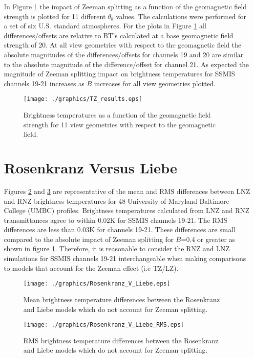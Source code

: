In Figure \ref{fig:TZ_results} the impact of Zeeman splitting as a function of the geomagnetic field strength is plotted for 11 different $\theta_{b}$ values. The calculations were performed for a set of six U.S. standard atmospheres. For the plots in Figure \ref{fig:TZ_results} all differences/offsets are relative to BT's calculated at a base geomagnetic field strength of 20\microtesla. At all view geometries with respect to the geomagnetic field the absolute magnitudes of the differences/offsets for channels 19 and 20 are similar to the absolute magnitude of the difference/offset for channel 21. As expected the magnitude of Zeeman splitting impact on brightness temperatures for SSMIS channels 19-21 increases as $B$ increases for all view geometries plotted. 
\begin{figure}[htp]
  \centering{}
  \texttt{[image: ./graphics/TZ\_results.eps]}
  \caption{Brightness temperatures as a function of the geomagnetic field strength for 11 view geometries with respect to the geomagnetic field.}
  \label{fig:TZ_results}
\end{figure}


\section{Rosenkranz Versus Liebe}
Figures \ref{fig:Rosenkranz_V_Liebe} and \ref{fig:Rosenkranz_V_Liebe_RMS} are representative of the mean and RMS differences between LNZ and RNZ brightness temperatures for 48 University of Maryland Baltimore College (UMBC) profiles. Brightness temperatures calculated from LNZ and RNZ transmittances agree to within 0.02K for SSMIS channels 19-21. The RMS differences are less than 0.03K for channels 19-21. These differences are small compared to the absolute impact of Zeeman splitting for $B$=0.4\microtesla{} or greater as shown in figure \ref{fig:TZ_results}. Therefore, it is reasonable to consider the RNZ and LNZ simulations for SSMIS channels 19-21 interchangeable when making comparisons to models that account for the Zeeman effect (i.e TZ/LZ). 

\begin{figure}[htp]
  \centering{}
  \texttt{[image: ./graphics/Rosenkranz\_V\_Liebe.eps]}
  \caption{Mean brightness temperature differences between the Rosenkranz and Liebe models which do not account for Zeeman splitting.}
  \label{fig:Rosenkranz_V_Liebe}
\end{figure}

\begin{figure}[htp]
  \centering{}
  \texttt{[image: ./graphics/Rosenkranz\_V\_Liebe\_RMS.eps]}
  \caption{RMS brightness temperature differences between the Rosenkranz and Liebe models which do not account for Zeeman splitting.}
  \label{fig:Rosenkranz_V_Liebe_RMS}
\end{figure}


